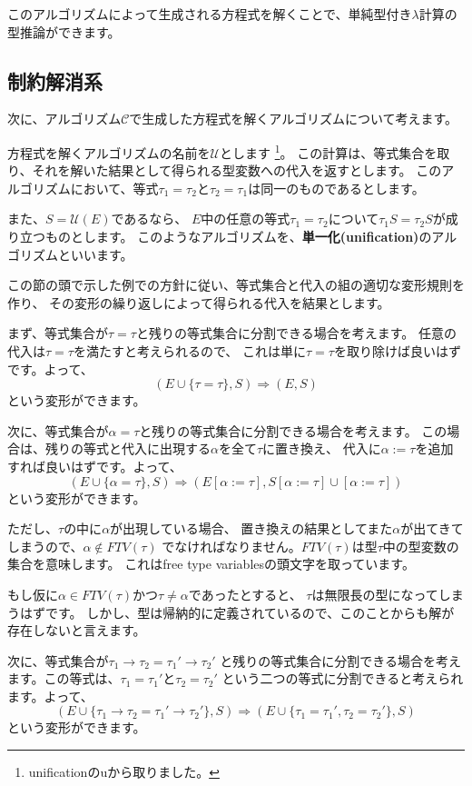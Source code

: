 このアルゴリズムによって生成される方程式を解くことで、単純型付き$\lambda$計算の型推論ができます。

\subsection{制約解消系}

次に、アルゴリズム$\mathcal C$で生成した方程式を解くアルゴリズムについて考えます。

方程式を解くアルゴリズムの名前を$\mathcal U$とします
\footnote{unificationのuから取りました。}。
この計算は、等式集合を取り、それを解いた結果として得られる型変数への代入を返すとします。
このアルゴリズムにおいて、等式$\tau_1 = \tau_2$と$\tau_2 = \tau_1$は同一のものであるとします。

また、$S = \mathcal{U}(E)$であるなら、
$E$中の任意の等式$\tau_1 = \tau_2$について$\tau_1 S = \tau_2 S$が成り立つものとします。
このようなアルゴリズムを、\textbf{単一化(unification)}のアルゴリズムといいます。

この節の頭で示した例での方針に従い、等式集合と代入の組の適切な変形規則を作り、
その変形の繰り返しによって得られる代入を結果とします。

まず、等式集合が$\tau = \tau$と残りの等式集合に分割できる場合を考えます。
任意の代入は$\tau = \tau$を満たすと考えられるので、
これは単に$\tau = \tau$を取り除けば良いはずです。よって、
\[
  (E \cup \{\tau = \tau\}, S) \Longrightarrow (E, S)
\]
という変形ができます。

次に、等式集合が$\alpha = \tau$と残りの等式集合に分割できる場合を考えます。
この場合は、残りの等式と代入に出現する$\alpha$を全て$\tau$に置き換え、
代入に$\alpha := \tau$を追加すれば良いはずです。よって、
\[
  (E \cup \{\alpha = \tau\}, S) \Longrightarrow
  (E[\alpha := \tau], S[\alpha := \tau] \cup [\alpha := \tau])
\]
という変形ができます。

ただし、$\tau$の中に$\alpha$が出現している場合、
置き換えの結果としてまた$\alpha$が出てきてしまうので、$\alpha \notin \mathit{FTV}(\tau)$
でなければなりません。$\mathit{FTV}(\tau)$は型$\tau$中の型変数の集合を意味します。
これはfree type variablesの頭文字を取っています。

もし仮に$\alpha \in \mathit{FTV}(\tau)$かつ$\tau \neq \alpha$であったとすると、
$\tau$は無限長の型になってしまうはずです。
しかし、型は帰納的に定義されているので、このことからも解が存在しないと言えます。

次に、等式集合が$\tau_1 \to \tau_2 = \tau_1' \to \tau_2'$
と残りの等式集合に分割できる場合を考えます。この等式は、$\tau_1 = \tau_1'$と$\tau_2 = \tau_2'$
という二つの等式に分割できると考えられます。よって、
\[
  (E \cup \{\tau_1 \to \tau_2 = \tau_1' \to \tau_2'\}, S) \Longrightarrow
  (E \cup \{\tau_1 = \tau_1', \tau_2 = \tau_2'\}, S)
\]
という変形ができます。

